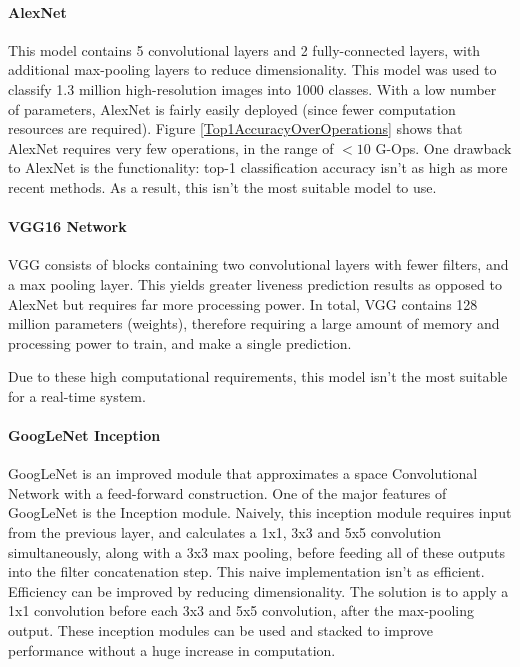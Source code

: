 \documentclass[12pt,a4paper]{article}
\begin{document}
            \paragraph{AlexNet} 
            This model contains 5 convolutional layers and 2 fully-connected layers, with additional max-pooling layers to reduce dimensionality. 
            This model was used to classify 1.3 million high-resolution images into 1000 classes. \cite{AlexNet} 
            With a low number of parameters, AlexNet is fairly easily deployed (since fewer computation resources are required). Figure \ref{Top1AccuracyOverOperations}
            shows that AlexNet requires very few operations, in the range of $<10$ G-Ops. 
            One drawback to AlexNet is the functionality: top-1 classification accuracy isn't as high as more recent methods. As a result, this isn't the most suitable model to use.
            \cite{DeepNeuralNetworkDeployability}
            
            \paragraph{VGG16 Network}
            VGG consists of blocks containing two convolutional layers with fewer filters, and a max pooling layer.  This yields greater liveness prediction results as opposed to AlexNet but requires far more processing power.
            In total, VGG contains 128 million parameters (weights), therefore requiring a large amount of memory and processing power to train, and make a single prediction. 
            \cite{DeepNeuralNetworkDeployability} 
            
            Due to these high computational requirements, this model isn't the most suitable for a real-time system.

            \paragraph{GoogLeNet Inception}
            
            GoogLeNet is an improved module that approximates a space Convolutional Network with a feed-forward construction. One of the major features of GoogLeNet is the Inception module.
            Naively, this inception module requires input from the previous layer, and calculates a 1x1, 3x3 and 5x5 convolution simultaneously, along with a 3x3 max pooling, before feeding all of these outputs into the filter concatenation step. 
            This naive implementation isn't as efficient. Efficiency can be improved by reducing dimensionality. The solution is to apply a 1x1 convolution before each 3x3 and 5x5 convolution, after the max-pooling output. 
            These inception modules can be used and stacked to improve performance without a huge increase in computation. \cite{GoogLeNet} 
            
\end{document}
